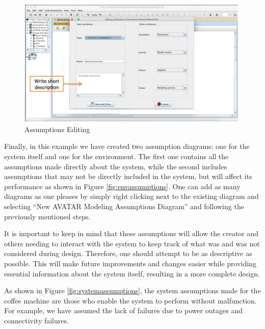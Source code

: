 \documentclass[12pt]{article}
\begin{document}
\begin{figure}[htbp]
\centering
\includegraphics[width=0.99\textwidth]{fig/assumptionsedit.jpg}
\caption{Assumptions Editing} \label{fig:assumptionsedit}
\end{figure}

Finally, in this example we have created two assumption diagrams; one for the system itself and one for the environment. The first one contains all the assumptions made directly about the system, while the second includes assumptions that may not be directly included in the system, but will affect its performance as shown in Figure \ref{fig:envassumptions}. One can add as many diagrams as one pleases by simply right clicking next to the existing diagram and selecting ``New AVATAR Modeling Assumptions Diagram'' and following the previously mentioned steps.

It is important to keep in mind that these assumptions will allow the creator and others needing to interact with the system to keep track of what was and was not considered during design. Therefore, one should attempt to be as descriptive as possible. This will make future improvements and changes easier while providing essential information about the system itself, resulting in a more complete design. 

As shown in Figure \ref{fig:systemassumptions}, the system assumptions made for the coffee machine are those who enable the system to perform without malfunction. For example, we have assumed the lack of failures due to power outages and connectivity failures. 
\end{document}
